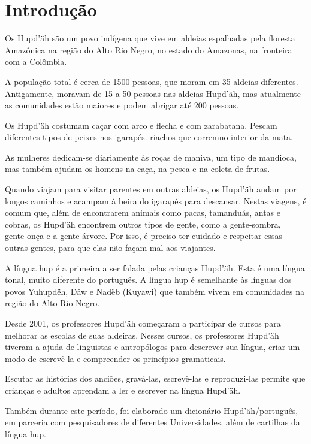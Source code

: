 \chapter{Introdução}

Os Hupd’äh são um povo indígena que vive em aldeias espalhadas pela floresta Amazônica na região do Alto Rio Negro, no estado do Amazonas, na fronteira com a Colômbia.

A população total é cerca de 1500 pessoas, que moram em 35 aldeias diferentes. Antigamente, moravam de 15 a 50 pessoas nas aldeias Hupd’äh, mas atualmente as comunidades estão maiores e podem abrigar até 200 pessoas.

Os Hupd’äh costumam caçar com arco e flecha e com zarabatana. Pescam diferentes tipos de peixes nos igarapés.­ riachos que corremno interior da mata.

As mulheres dedicam-se diariamente às roças de maniva, um tipo de mandioca, mas também ajudam os homens na caça, na pesca e na coleta de frutas.

Quando viajam para visitar parentes em outras aldeias, os Hupd’äh andam por longos caminhos e acampam à beira do igarapés para descansar. Nestas viagens, é comum que, além de encontrarem animais como pacas, tamanduás, antas e cobras, os Hupd’äh encontrem outros tipos de gente, como a gente­-sombra, gente-­onça e a gente-árvore. Por isso, é preciso ter cuidado e respeitar essas outras gentes, para que elas não façam mal aos viajantes.

A língua hup é a primeira a ser falada pelas crianças Hupd’äh. Esta é uma língua tonal, muito
diferente do português. A língua hup é semelhante às línguas dos povos Yuhupdëh,
Dâw e Nadëb (Kuyawi) que também vivem em comunidades na região do Alto Rio Negro.

Desde 2001, os professores Hupd’äh começaram a participar de cursos para melhorar as
escolas de suas aldeiras. Nesses cursos, os professores Hupd’äh tiveram a ajuda de linguistas e antropólogos para descrever sua língua, criar um modo de escrevê-­la e compreender os princípios gramaticais.

Escutar as histórias dos anciões, gravá­-las, escrevê-­las e reproduzi-­las permite que
crianças e adultos aprendam a ler e escrever na língua Hupd’äh.

Também durante este período, foi elaborado um dicionário Hupd’äh/português, em parceria
com pesquisadores de diferentes Universidades, além de cartilhas da língua hup.